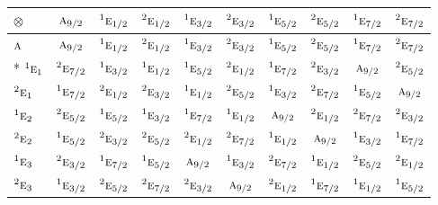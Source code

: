 \documentclass[10pt,a4paper]{article}
\numberwithin{equation}{section}
\newcommand{\irr}[1]{\text{\normalfont\scshape #1}}
\newcommand{\conjpair}[1]{{}^{#1}}
\newcommand{\irrprod}{\otimes}
\begin{document}
{\small\setlength{\tabcolsep}{3pt}\begin{longtable}{@{}lccccccccc@{}}\toprule
$\irrprod$ & $\irr{a}_{9/2}$ & $\conjpair{1}\irr{e}_{1/2}$ & $\conjpair{2}\irr{e}_{1/2}$ & $\conjpair{1}\irr{e}_{3/2}$ & $\conjpair{2}\irr{e}_{3/2}$ & $\conjpair{1}\irr{e}_{5/2}$ & $\conjpair{2}\irr{e}_{5/2}$ & $\conjpair{1}\irr{e}_{7/2}$ & $\conjpair{2}\irr{e}_{7/2}$\\\midrule\endhead
\bottomrule\endfoot\endlastfoot
$\irr{a}$ & $\irr{a}_{9/2}$ & $\conjpair{1}\irr{e}_{1/2}$ & $\conjpair{2}\irr{e}_{1/2}$ & $\conjpair{1}\irr{e}_{3/2}$ & $\conjpair{2}\irr{e}_{3/2}$ & $\conjpair{1}\irr{e}_{5/2}$ & $\conjpair{2}\irr{e}_{5/2}$ & $\conjpair{1}\irr{e}_{7/2}$ & $\conjpair{2}\irr{e}_{7/2}$\\*
$\conjpair{1}\irr{e}_{1}$ & $\conjpair{2}\irr{e}_{7/2}$ & $\conjpair{1}\irr{e}_{3/2}$ & $\conjpair{1}\irr{e}_{1/2}$ & $\conjpair{1}\irr{e}_{5/2}$ & $\conjpair{2}\irr{e}_{1/2}$ & $\conjpair{1}\irr{e}_{7/2}$ & $\conjpair{2}\irr{e}_{3/2}$ & $\irr{a}_{9/2}$ & $\conjpair{2}\irr{e}_{5/2}$\\
$\conjpair{2}\irr{e}_{1}$ & $\conjpair{1}\irr{e}_{7/2}$ & $\conjpair{2}\irr{e}_{1/2}$ & $\conjpair{2}\irr{e}_{3/2}$ & $\conjpair{1}\irr{e}_{1/2}$ & $\conjpair{2}\irr{e}_{5/2}$ & $\conjpair{1}\irr{e}_{3/2}$ & $\conjpair{2}\irr{e}_{7/2}$ & $\conjpair{1}\irr{e}_{5/2}$ & $\irr{a}_{9/2}$\\
$\conjpair{1}\irr{e}_{2}$ & $\conjpair{2}\irr{e}_{5/2}$ & $\conjpair{1}\irr{e}_{5/2}$ & $\conjpair{1}\irr{e}_{3/2}$ & $\conjpair{1}\irr{e}_{7/2}$ & $\conjpair{1}\irr{e}_{1/2}$ & $\irr{a}_{9/2}$ & $\conjpair{2}\irr{e}_{1/2}$ & $\conjpair{2}\irr{e}_{7/2}$ & $\conjpair{2}\irr{e}_{3/2}$\\
$\conjpair{2}\irr{e}_{2}$ & $\conjpair{1}\irr{e}_{5/2}$ & $\conjpair{2}\irr{e}_{3/2}$ & $\conjpair{2}\irr{e}_{5/2}$ & $\conjpair{2}\irr{e}_{1/2}$ & $\conjpair{2}\irr{e}_{7/2}$ & $\conjpair{1}\irr{e}_{1/2}$ & $\irr{a}_{9/2}$ & $\conjpair{1}\irr{e}_{3/2}$ & $\conjpair{1}\irr{e}_{7/2}$\\
$\conjpair{1}\irr{e}_{3}$ & $\conjpair{2}\irr{e}_{3/2}$ & $\conjpair{1}\irr{e}_{7/2}$ & $\conjpair{1}\irr{e}_{5/2}$ & $\irr{a}_{9/2}$ & $\conjpair{1}\irr{e}_{3/2}$ & $\conjpair{2}\irr{e}_{7/2}$ & $\conjpair{1}\irr{e}_{1/2}$ & $\conjpair{2}\irr{e}_{5/2}$ & $\conjpair{2}\irr{e}_{1/2}$\\
$\conjpair{2}\irr{e}_{3}$ & $\conjpair{1}\irr{e}_{3/2}$ & $\conjpair{2}\irr{e}_{5/2}$ & $\conjpair{2}\irr{e}_{7/2}$ & $\conjpair{2}\irr{e}_{3/2}$ & $\irr{a}_{9/2}$ & $\conjpair{2}\irr{e}_{1/2}$ & $\conjpair{1}\irr{e}_{7/2}$ & $\conjpair{1}\irr{e}_{1/2}$ & $\conjpair{1}\irr{e}_{5/2}$\\

\end{longtable}}
\end{document}
